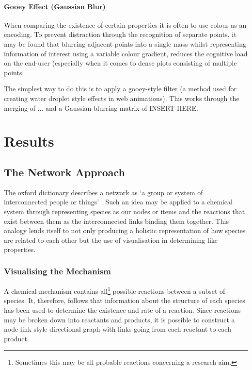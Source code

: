 \paragraph{Gooey Effect (Gaussian Blur)}
When comparing the existence of certain properties it is often to use colour as an encoding. To prevent distraction through the recognition of separate points, it may be found that blurring adjacent points into a single mass whilst representing information of interest using a variable colour gradient, reduces the cognitive load on the end-user (especially when it comes to dense plots consisting of multiple points.

The simplest way to do this is to apply a gooey-style filter (a method used for creating water droplet style effects in web animations). This works through the merging of ... and a Gaussian blurring matrix of INSERT HERE.


\section{Results}

\subsection{The Network Approach}

The oxford dictionary describes a network as `a group or system of interconnected people or things' \cite{definenetwork}. Such an idea may be applied to a chemical system through representing species as our nodes or items and the reactions that exist between them as the interconnected links binding them together. This analogy lends itself to not only producing a holistic representation of how species are related to each other but the use of visualisation in determining like properties.

\subsubsection{Visualising the Mechanism}

A chemical mechanism contains all\footnote{Sometimes this may be all probable reactions concerning a research aim.} possible reactions between a subset of species. It, therefore, follows that information about the structure of each species has been used to determine the existence and rate of a reaction. Since reactions may be broken down into reactants and products, it is possible to construct a node-link style directional graph with links going from each reactant to each product.\\

